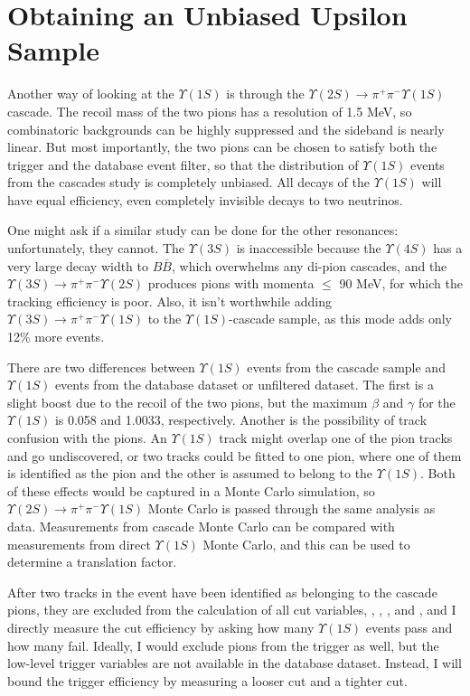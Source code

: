 \section{Obtaining an Unbiased Upsilon Sample}

Another way of looking at the $\Upsilon(1S)$ is through the
$\Upsilon(2S) \to \pi^+\pi^- \Upsilon(1S)$ cascade.  The recoil mass
of the two pions has a resolution of 1.5 MeV, so combinatoric
backgrounds can be highly suppressed and the sideband is nearly
linear.  But most importantly, the two pions can be chosen to satisfy
both the trigger and the database event filter, so that the
distribution of $\Upsilon(1S)$ events from the cascades study is
completely unbiased.  All decays of the $\Upsilon(1S)$ will have equal
efficiency, even completely invisible decays to two neutrinos.

One might ask if a similar study can be done for the other resonances:
unfortunately, they cannot.  The $\Upsilon(3S)$ is inaccessible
because the $\Upsilon(4S)$ has a very large decay width to $B\bar{B}$,
which overwhelms any di-pion cascades, and the $\Upsilon(3S) \to
\pi^+\pi^- \Upsilon(2S)$ produces pions with momenta $\le$ 90 MeV, for
which the tracking efficiency is poor.  Also, it isn't worthwhile
adding $\Upsilon(3S) \to \pi^+\pi^- \Upsilon(1S)$ to the
$\Upsilon(1S)$-cascade sample, as this mode adds only 12\% more
events.

There are two differences between $\Upsilon(1S)$ events from the
cascade sample and $\Upsilon(1S)$ events from the database dataset or
unfiltered dataset.  The first is a slight boost due to the recoil of
the two pions, but the maximum $\beta$ and $\gamma$ for the
$\Upsilon(1S)$ is 0.058 and 1.0033, respectively.  Another is the
possibility of track confusion with the pions.  An $\Upsilon(1S)$
track might overlap one of the pion tracks and go undiscovered, or two
tracks could be fitted to one pion, where one of them is identified as
the pion and the other is assumed to belong to the $\Upsilon(1S)$.
Both of these effects would be captured in a Monte Carlo simulation,
so $\Upsilon(2S) \to \pi^+\pi^- \Upsilon(1S)$ Monte Carlo is passed
through the same analysis as data.  Measurements from cascade Monte
Carlo can be compared with measurements from direct $\Upsilon(1S)$
Monte Carlo, and this can be used to determine a translation factor.

After two tracks in the event have been identified as belonging to the
cascade pions, they are excluded from the calculation of all cut
variables, \dxy, \dz, \pone, and \visen, and I directly measure the
cut efficiency by asking how many $\Upsilon(1S)$ events pass and how
many fail.  Ideally, I would exclude pions from the trigger as well,
but the low-level trigger variables are not available in the database
dataset.  Instead, I will bound the trigger efficiency by measuring a
looser cut and a tighter cut.

